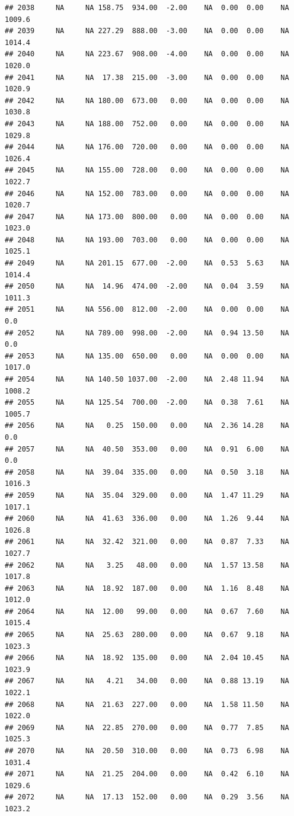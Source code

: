 \documentclass{article}\usepackage{graphicx, color}
\makeatletter
\newenvironment{kframe}{%
 \def\at@end@of@kframe{}%
 \ifinner\ifhmode%
  \def\at@end@of@kframe{\end{minipage}}%
  \begin{minipage}{\columnwidth}%
 \fi\fi%
 \def\FrameCommand##1{\hskip\@totalleftmargin \hskip-\fboxsep
 \colorbox{shadecolor}{##1}\hskip-\fboxsep
     \hskip-\linewidth \hskip-\@totalleftmargin \hskip\columnwidth}%
 \MakeFramed {\advance\hsize-\width
   \@totalleftmargin\z@ \linewidth\hsize
   \@setminipage}}%
 {\par\unskip\endMakeFramed%
 \at@end@of@kframe}
\newenvironment{knitrout}{}{} %
\makeatother
\begin{document}
\begin{knitrout}
\begin{kframe}
\begin{verbatim}
## 2038     NA     NA 158.75  934.00  -2.00    NA  0.00  0.00    NA 1009.6
## 2039     NA     NA 227.29  888.00  -3.00    NA  0.00  0.00    NA 1014.4
## 2040     NA     NA 223.67  908.00  -4.00    NA  0.00  0.00    NA 1020.0
## 2041     NA     NA  17.38  215.00  -3.00    NA  0.00  0.00    NA 1020.9
## 2042     NA     NA 180.00  673.00   0.00    NA  0.00  0.00    NA 1030.8
## 2043     NA     NA 188.00  752.00   0.00    NA  0.00  0.00    NA 1029.8
## 2044     NA     NA 176.00  720.00   0.00    NA  0.00  0.00    NA 1026.4
## 2045     NA     NA 155.00  728.00   0.00    NA  0.00  0.00    NA 1022.7
## 2046     NA     NA 152.00  783.00   0.00    NA  0.00  0.00    NA 1020.7
## 2047     NA     NA 173.00  800.00   0.00    NA  0.00  0.00    NA 1023.0
## 2048     NA     NA 193.00  703.00   0.00    NA  0.00  0.00    NA 1025.1
## 2049     NA     NA 201.15  677.00  -2.00    NA  0.53  5.63    NA 1014.4
## 2050     NA     NA  14.96  474.00  -2.00    NA  0.04  3.59    NA 1011.3
## 2051     NA     NA 556.00  812.00  -2.00    NA  0.00  0.00    NA    0.0
## 2052     NA     NA 789.00  998.00  -2.00    NA  0.94 13.50    NA    0.0
## 2053     NA     NA 135.00  650.00   0.00    NA  0.00  0.00    NA 1017.0
## 2054     NA     NA 140.50 1037.00  -2.00    NA  2.48 11.94    NA 1008.2
## 2055     NA     NA 125.54  700.00  -2.00    NA  0.38  7.61    NA 1005.7
## 2056     NA     NA   0.25  150.00   0.00    NA  2.36 14.28    NA    0.0
## 2057     NA     NA  40.50  353.00   0.00    NA  0.91  6.00    NA    0.0
## 2058     NA     NA  39.04  335.00   0.00    NA  0.50  3.18    NA 1016.3
## 2059     NA     NA  35.04  329.00   0.00    NA  1.47 11.29    NA 1017.1
## 2060     NA     NA  41.63  336.00   0.00    NA  1.26  9.44    NA 1026.8
## 2061     NA     NA  32.42  321.00   0.00    NA  0.87  7.33    NA 1027.7
## 2062     NA     NA   3.25   48.00   0.00    NA  1.57 13.58    NA 1017.8
## 2063     NA     NA  18.92  187.00   0.00    NA  1.16  8.48    NA 1012.0
## 2064     NA     NA  12.00   99.00   0.00    NA  0.67  7.60    NA 1015.4
## 2065     NA     NA  25.63  280.00   0.00    NA  0.67  9.18    NA 1023.3
## 2066     NA     NA  18.92  135.00   0.00    NA  2.04 10.45    NA 1023.9
## 2067     NA     NA   4.21   34.00   0.00    NA  0.88 13.19    NA 1022.1
## 2068     NA     NA  21.63  227.00   0.00    NA  1.58 11.50    NA 1022.0
## 2069     NA     NA  22.85  270.00   0.00    NA  0.77  7.85    NA 1025.3
## 2070     NA     NA  20.50  310.00   0.00    NA  0.73  6.98    NA 1031.4
## 2071     NA     NA  21.25  204.00   0.00    NA  0.42  6.10    NA 1029.6
## 2072     NA     NA  17.13  152.00   0.00    NA  0.29  3.56    NA 1023.2

\end{verbatim}
\end{kframe}
\end{knitrout}
\end{document}
